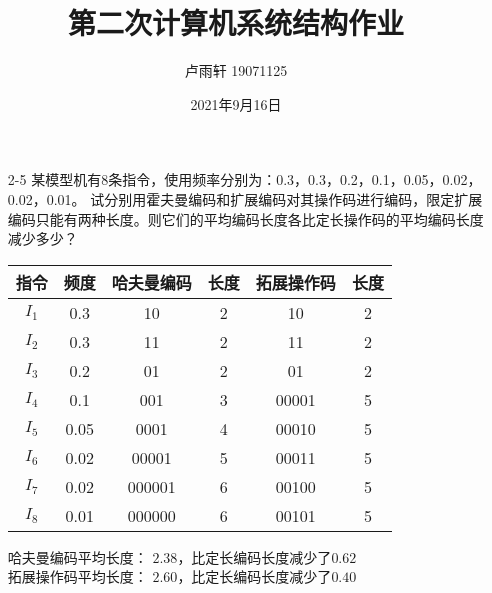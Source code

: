 \documentclass{ctexart}
\title{第二次计算机系统结构作业}
\author{卢雨轩 19071125}
\date{2021年9月16日}
\begin{document}
\maketitle

\begin{itemize}
    \item[2-5] 某模型机有8条指令，使用频率分别为：0.3，0.3，0.2，0.1，0.05，0.02，0.02，0.01。
        试分别用霍夫曼编码和扩展编码对其操作码进行编码，限定扩展编码只能有两种长度。则它们的平均编码长度各比定长操作码的平均编码长度减少多少？ 
    
        \begin{center}
            \label{table:1}
            \begin{tabular}{cccccc}
                \toprule
                指令 & 频度 & 哈夫曼编码 & 长度 & 拓展操作码 & 长度 \\
                \midrule
                $I_1$ & 0.3 & 10 & 2 & 10 & 2 \\
                $I_2$ & 0.3 & 11 & 2 & 11 & 2 \\
                $I_3$ & 0.2 & 01 & 2 & 01 & 2 \\
                $I_4$ & 0.1 & 001 & 3 & 00001 & 5 \\
                $I_5$ & 0.05 & 0001 & 4 & 00010 & 5 \\
                $I_6$ & 0.02 & 00001 & 5 & 00011 & 5 \\
                $I_7$ & 0.02 & 000001 & 6 & 00100 & 5 \\
                $I_8$ & 0.01 & 000000 & 6 & 00101 & 5 \\
                \bottomrule
            \end{tabular}
        \end{center}
        哈夫曼编码平均长度： $2.38$，比定长编码长度减少了$0.62$\\
        拓展操作码平均长度： $2.60$，比定长编码长度减少了$0.40$
\end{itemize}
\end{document}
